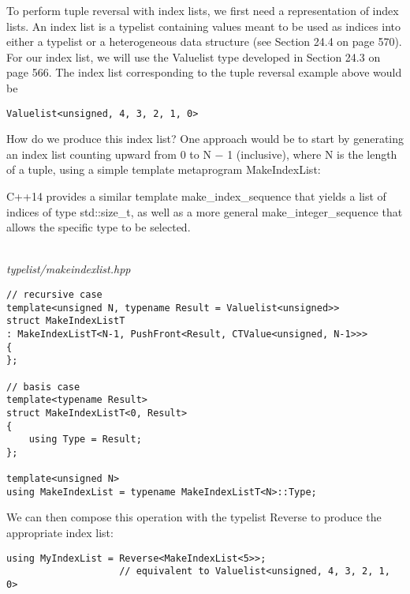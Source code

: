 
To perform tuple reversal with index lists, we first need a representation of index lists. An index list is a typelist containing values meant to be used as indices into either a typelist or a heterogeneous data structure (see Section 24.4 on page 570). For our index list, we will use the Valuelist type developed in Section 24.3 on page 566. The index list corresponding to the tuple reversal example above would be

\begin{lstlisting}[style=styleCXX]
Valuelist<unsigned, 4, 3, 2, 1, 0>
\end{lstlisting}

How do we produce this index list? One approach would be to start by generating an index list counting upward from 0 to N − 1 (inclusive), where N is the length of a tuple, using a simple template metaprogram MakeIndexList:

\begin{tcolorbox}[colback=webgreen!5!white,colframe=webgreen!75!black]
\hspace*{0.75cm}C++14 provides a similar template make\_index\_sequence that yields a list of indices of type std::size\_t, as well as a more general make\_integer\_sequence that allows the specific type to be selected.
\end{tcolorbox}

\hspace*{\fill} \\ %
\noindent
\textit{typelist/makeindexlist.hpp}
\begin{lstlisting}[style=styleCXX]
// recursive case
template<unsigned N, typename Result = Valuelist<unsigned>>
struct MakeIndexListT
: MakeIndexListT<N-1, PushFront<Result, CTValue<unsigned, N-1>>>
{
};

// basis case
template<typename Result>
struct MakeIndexListT<0, Result>
{
	using Type = Result;
};

template<unsigned N>
using MakeIndexList = typename MakeIndexListT<N>::Type;
\end{lstlisting}

We can then compose this operation with the typelist Reverse to produce the appropriate index list:

\begin{lstlisting}[style=styleCXX]
using MyIndexList = Reverse<MakeIndexList<5>>;
					// equivalent to Valuelist<unsigned, 4, 3, 2, 1, 0>
\end{lstlisting}


